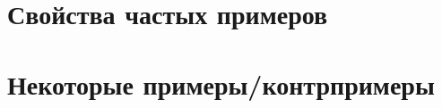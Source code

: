 \section{Свойства частых примеров}\label{sec:table_of_examples}


\section{Некоторые примеры/контрпримеры}


% 
% 
% 
% 
% 
% 
% 
% 
% 
% 
% 
% 
% 
% 


